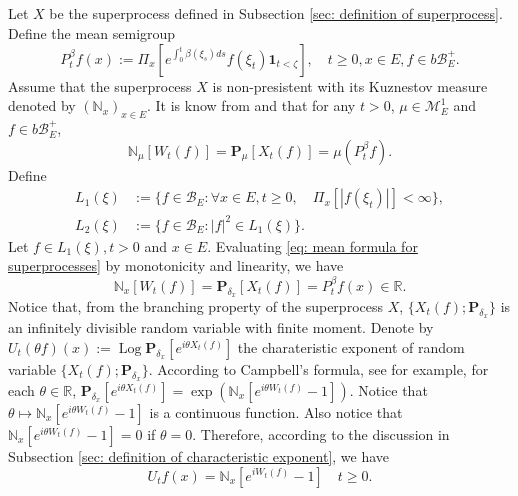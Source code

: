\documentclass[12pt,oneside,english]{amsart}
\theoremstyle{plain}
\theoremstyle{definition}
\numberwithin{equation}{section}
\begin{document}
\subsection{}
\label{sec: definition of vf}
    Let $X$ be the superprocess defined in Subsection \ref{sec: definition of superprocess}.
    Define the mean semigroup
\begin{equation}
    P_t^\beta f(x)
    := \Pi_{x}[e^{\int_0^t \beta(\xi_s)ds}f(\xi_t) \mathbf 1_{t< \zeta}],
    \quad t\geq 0, x\in E, f\in b\mathscr B^+_E.
\end{equation}
    Assume that the superprocess $X$ is non-presistent with its Kuznestov measure denoted by $(\mathbb N_x)_{x\in E}$.
    It is know from \cite[Proposition 2.27]{Li2011Measure-valued} and \cite[Theorem 2.7]{Kyprianou2014Fluctuations} that for any $t > 0$, $\mu \in \mathcal M_E^1$ and $f\in b\mathscr B^+_E$,
\begin{equation}
\label{eq: mean formula for superprocesses}
    \mathbb N_{\mu}[W_t(f)]
    =\mathbf P_{\mu}[X_t(f)]=\mu(P^\beta_t f).
\end{equation}
    Define
\begin{align}
    L_1(\xi)
    &:= \{f\in \mathscr B_E: \forall x\in E, t\geq 0, \quad \Pi_x[|f(\xi_t)|]< \infty\},
    \\L_2(\xi)
    &:= \{f \in \mathscr B_E: |f|^2 \in L_1(\xi)\}.
\end{align}
    Let $f\in L_1(\xi), t >0$ and $x\in E$.
    Evaluating \eqref{eq: mean formula for superprocesses} by monotonicity and linearity, we have
\begin{equation}
    \mathbb N_x[W_t(f)]
    =\mathbf P_{\delta_x}[X_t(f)]=P^\beta_t f(x) \in \mathbb R.
\end{equation}
    Notice that, from the branching property of the superprocess $X$, $\{X_t(f); \mathbf P_{\delta_x}\}$ is an infinitely divisible random variable with finite moment.
    Denote by $U_t(\theta f)(x) := \operatorname{Log} \mathbf P_{\delta_x}[e^{i \theta X_t(f)}]$  the charateristic exponent of random variable $\{X_t(f); \mathbf P_{\delta_x}\}$.
    According to Campbell's formula, see \cite[Theorem 2.7]{Kyprianou2014Fluctuations} for example, for each $\theta \in \mathbb R$,
$   \mathbf P_{\delta_x} [e^{i\theta X_t(f)}]
    = \exp(\mathbb N_x[ e^{i\theta W_t(f)} - 1]).
$
    Notice that $\theta \mapsto \mathbb N_x[e^{i\theta W_t(f)} - 1]$ is a continuous function.
    Also notice that $\mathbb N_x[e^{i\theta W_t(f)} - 1] = 0$ if $\theta = 0$.
    Therefore, according to the discussion in Subsection \ref{sec: definition of characteristic exponent}, we have
\begin{equation}
\label{eq: N and characteristic exponent}
    U_tf(x) = \mathbb N_x[e^{i W_t(f)} - 1]
    \quad t \geq 0.
\end{equation}
\end{document}
